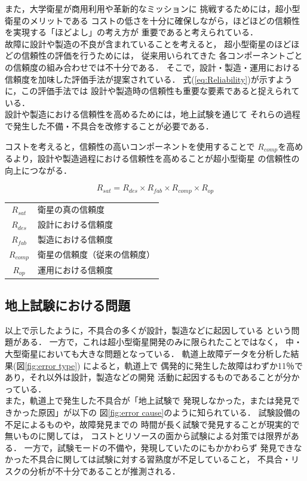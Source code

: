 \documentclass[11pt]{jsreport}
\begin{document}
また，大学衛星が商用利用や革新的なミッションに
挑戦するためには，超小型衛星のメリットである
コストの低さを十分に確保しながら，ほどほどの信頼性
を実現する「ほどよし」の考え方が
重要であると考えられている\cite{SHIRASAKA2011}．\\
故障に設計や製造の不良が含まれていることを考えると，
超小型衛星のほどほどの信頼性の評価を行うためには，
従来用いられてきた
各コンポーネントごとの信頼度の組み合わせでは不十分である．
そこで，設計・製造・運用における
信頼度を加味した評価手法が提案されている\cite{SHIRASAKA2011}．
式(\ref{eq:Reliability})が示すように，この評価手法では
設計や製造時の信頼性も重要な要素であると捉えられている．\\
設計や製造における信頼性を高めるためには，地上試験を通じて
それらの過程で発生した不備・不具合を改修することが必要である．

コストを考えると，信頼性の高いコンポーネントを使用することで
$R_{comp}$を高めるより，設計や製造過程における信頼性を高めることが超小型衛星
の信頼性の向上につながる．

\begin{equation}
   R_{sat} = R_{des} \times R_{fab} \times R_{comp} \times R_{op} \label{eq:Reliability}
\end{equation}
\begin{table}[H]
   \centering
      \begin{tabular}{cl} 
        $R_{sat}$ & 衛星の真の信頼度\\
        $R_{des}$ & 設計における信頼度\\
        $R_{fab}$ & 製造における信頼度\\
        $R_{comp}$ & 衛星の信頼度（従来の信頼度）\\%
        $R_{op}$ & 運用における信頼度
      \end{tabular}
\end{table}

\subsection{地上試験における問題}
以上で示したように，不具合の多くが設計，製造などに起因している
という問題がある．
一方で，これは超小型衛星開発のみに限られたことではなく，
中・大型衛星においても大きな問題となっている．
軌道上故障データを分析した結果\cite{SAITO2011}(図\ref{fig:error type})
によると，軌道上で
偶発的に発生した故障はわずか11％であり，それ以外は設計，製造などの開発
活動に起因するものであることが分かっている．\\
また，軌道上で発生した不具合が「地上試験で
発現しなかった，または発見できかった原因」が以下の
図\ref{fig:error cause}のように知られている．
試験設備の不足によるものや，故障発見までの
時間が長く試験で発見することが現実的で無いものに関しては，
コストとリソースの面から試験による対策では限界がある．
一方で，試験モードの不備や，発現していたのにもかかわらず
発見できなかった不具合に関しては試験に対する習熟度が不足していること，
不具合・リスクの分析が不十分であることが推測される\cite{SAITO2011}．
\end{document}
